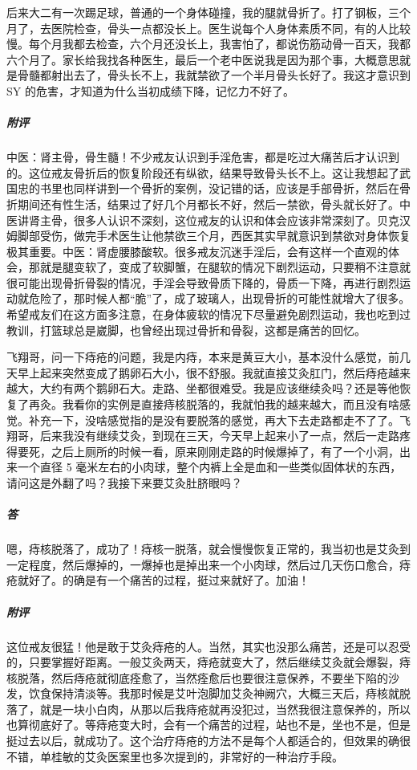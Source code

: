 \begin{case}
    后来大二有一次踢足球，普通的一个身体碰撞，我的腿就骨折了。打了钢板，三个月了，去医院检查，骨头一点都没长上。医生说每个人身体素质不同，有的人比较慢。每个月我都去检查，六个月还没长上，我害怕了，都说伤筋动骨一百天，我都六个月了。家长给我找各种医生，最后一个老中医说我是因为那个事，大概意思就是骨髓都射出去了，骨头长不上，我就禁欲了一个半月骨头长好了。我这才意识到 SY 的危害，才知道为什么当初成绩下降，记忆力不好了。
    \subparagraph{附评} 中医：肾主骨，骨生髓！不少戒友认识到手淫危害，都是吃过大痛苦后才认识到的。这位戒友骨折后的恢复阶段还有纵欲，结果导致骨头长不上。这让我想起了武国忠的书里也同样讲到一个骨折的案例，没记错的话，应该是手部骨折，然后在骨折期间还有性生活，结果过了好几个月都长不好，然后一禁欲，骨头就长好了。中医讲肾主骨，很多人认识不深刻，这位戒友的认识和体会应该非常深刻了。贝克汉姆脚部受伤，做完手术医生让他禁欲三个月，西医其实早就意识到禁欲对身体恢复极其重要。中医：肾虚腰膝酸软。很多戒友沉迷手淫后，会有这样一个直观的体会，那就是腿变软了，变成了软脚蟹，在腿软的情况下剧烈运动，只要稍不注意就很可能出现骨折骨裂的情况，手淫会导致骨质下降的，骨质一下降，再进行剧烈运动就危险了，那时候人都“脆”了，成了玻璃人，出现骨折的可能性就增大了很多。希望戒友们在这方面多注意，在身体疲软的情况下尽量避免剧烈运动，我也吃到过教训，打篮球总是崴脚，也曾经出现过骨折和骨裂，这都是痛苦的回忆。
\end{case}

\begin{case}
    飞翔哥，问一下痔疮的问题，我是内痔，本来是黄豆大小，基本没什么感觉，前几天早上起来突然变成了鹅卵石大小，很不舒服。我就直接艾灸肛门，然后痔疮越来越大，大约有两个鹅卵石大。走路、坐都很难受。我是应该继续灸吗？还是等他恢复了再灸。我看你的实例是直接痔核脱落的，我就怕我的越来越大，而且没有啥感觉。补充一下，没啥感觉指的是没有要脱落的感觉，再大下去走路都走不了了。飞翔哥，后来我没有继续艾灸，到现在三天，今天早上起来小了一点，然后一走路疼得要死，之后上厕所的时候一看，原来刚刚走路的时候爆掉了，有了一个小洞，出来一个直径 5 毫米左右的小肉球，整个内裤上全是血和一些类似固体状的东西，请问这是外翻了吗？我接下来要艾灸肚脐眼吗？
    \subparagraph{答} 嗯，痔核脱落了，成功了！痔核一脱落，就会慢慢恢复正常的，我当初也是艾灸到一定程度，然后爆掉的，一爆掉也是掉出来一个小肉球，然后过几天伤口愈合，痔疮就好了。的确是有一个痛苦的过程，挺过来就好了。加油！
    \subparagraph{附评} 这位戒友很猛！他是敢于艾灸痔疮的人。当然，其实也没那么痛苦，还是可以忍受的，只要掌握好距离。一般艾灸两天，痔疮就变大了，然后继续艾灸就会爆裂，痔核脱落，然后痔疮就彻底痊愈了，当然痊愈后也要很注意保养，不要坐下陷的沙发，饮食保持清淡等。我那时候是艾叶泡脚加艾灸神阙穴，大概三天后，痔核就脱落了，就是一块小白肉，从那以后我痔疮就再没犯过，当然我很注意保养的，所以也算彻底好了。等痔疮变大时，会有一个痛苦的过程，站也不是，坐也不是，但是挺过去以后，就成功了。这个治疗痔疮的方法不是每个人都适合的，但效果的确很不错，单桂敏的艾灸医案里也多次提到的，非常好的一种治疗手段。
\end{case}


